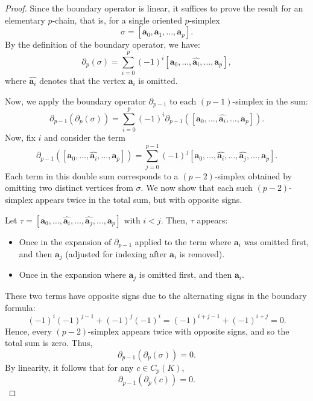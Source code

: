 \documentclass[12pt,oneside,reqno]{amsart}
\theoremstyle{plain}
\theoremstyle{definition}
\theoremstyle{remark}
\newcommand{\0}{{\textbf{0}}}
\begin{document}
\begin{proof}
Since the boundary operator is linear, it suffices to prove the result for an elementary $p$-chain, that is, for a single oriented $p$-simplex 
\[
\sigma = [\mathbf{a}_0, \mathbf{a}_1, \dots, \mathbf{a}_p].
\]
By the definition of the boundary operator, we have:
\[
\partial_p(\sigma) = \sum_{i=0}^{p} (-1)^i [\mathbf{a}_0, \dots, \widehat{\mathbf{a}_i}, \dots, \mathbf{a}_p],
\]
where $\widehat{\mathbf{a}_i}$ denotes that the vertex $\mathbf{a}_i$ is omitted.

Now, we apply the boundary operator $\partial_{p-1}$ to each $(p-1)$-simplex in the sum:
\[
\partial_{p-1}(\partial_p(\sigma)) = \sum_{i=0}^{p} (-1)^i \partial_{p-1}([\mathbf{a}_0, \dots, \widehat{\mathbf{a}_i}, \dots, \mathbf{a}_p]).
\]
Now, fix $i$ and consider the term 
\[
\partial_{p-1}([\mathbf{a}_0, \dots, \widehat{\mathbf{a}_i}, \dots, \mathbf{a}_p]) = \sum_{j=0}^{p-1} (-1)^j [\mathbf{a}_0, \dots, \widehat{\mathbf{a}_i}, \dots, \widehat{\mathbf{a}_j}, \dots, \mathbf{a}_p].
\]
Each term in this double sum corresponds to a $(p-2)$-simplex obtained by omitting two distinct vertices from $\sigma$. We now show that each such $(p-2)$-simplex appears twice in the total sum, but with opposite signs.

Let $\tau = [\mathbf{a}_0, \dots, \widehat{\mathbf{a}_i}, \dots, \widehat{\mathbf{a}_j}, \dots, \mathbf{a}_p]$ with $i < j$. Then, $\tau$ appears:
\begin{itemize}
\item Once in the expansion of $\partial_{p-1}$ applied to the term where $\mathbf{a}_i$ was omitted first, and then $\mathbf{a}_j$ (adjusted for indexing after $\mathbf{a}_i$ is removed).
\item Once in the expansion where $\mathbf{a}_j$ is omitted first, and then $\mathbf{a}_i$.
\end{itemize}
These two terms have opposite signs due to the alternating signs in the boundary formula:
\[
(-1)^i (-1)^{j-1} + (-1)^j (-1)^i = (-1)^{i + j - 1} + (-1)^{i + j} = 0.
\]
Hence, every $(p-2)$-simplex appears twice with opposite signs, and so the total sum is zero. Thus,
\[
\partial_{p-1}(\partial_p(\sigma)) = 0.
\]
By linearity, it follows that for any $c \in C_p(K)$,
\[
\partial_{p-1}(\partial_p(c)) = 0.
\]
\end{proof}
\end{document}

